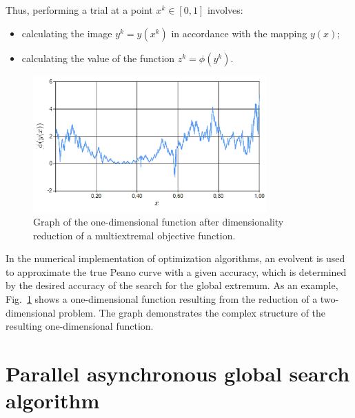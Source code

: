 \documentclass[runningheads]{llncs}
\begin{document}
Thus, performing a trial at a point $x^k \in [0,1]$ involves:
\begin{itemize}
    \item calculating the image $y^k=y(x^k)$ in accordance with the mapping $y(x)$;
    \item calculating the value of the function $z^k=\phi(y^k)$.
\end{itemize}

\begin{figure}
\center
\includegraphics[width=0.8\textwidth]{fig1.png}
\caption{Graph of the one-dimensional function after dimensionality reduction of a multiextremal objective function.} \label{fig1}
\end{figure}

In the numerical implementation of optimization algorithms, an evolvent is used to approximate the true Peano curve with a given accuracy, which is determined by the desired accuracy of the search for the global extremum. As an example, Fig.~\ref{fig1} shows a one-dimensional function resulting from the reduction of a two-dimensional problem. The graph demonstrates the complex structure of the resulting one-dimensional function.

\section{Parallel asynchronous global search algorithm}\label{sec:PA}
\end{document}
